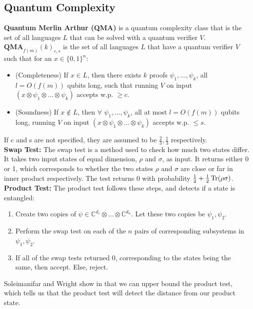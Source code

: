\documentclass[10pt]{article}
\newcommand{\C}{\mathbb{C}}
\begin{document}
\subsection{Quantum Complexity}
\textbf{Quantum Merlin Arthur (QMA)} is a quantum complexity class that is the set of all languages $L$ that can be solved with a quantum verifier $V$. $\textbf{QMA}_{f(m)}(k)_{c,s}$ is the set of all languages $L$ that have a quantum verifier $V$ such that for an $x \in \{0,1\}^n$:
\begin{itemize}
    \item 
    (Completeness) If $x \in L$, then there exists $k$ proofs $\psi_1, \dots, \psi_k$, all $l = O(f(m))$ qubits long, such that running $V$ on input $(x \otimes \psi_1 \otimes \dots \otimes \psi_k)$ accepts w.p. $\ge c$.
    \item
    (Soundness) If $x \notin L$, then $\forall$ $\psi_1, \dots, \psi_k$, all at most $l = O(f(m))$ qubits long,  running $V$ on input
    $(x \otimes \psi_1 \otimes \dots \otimes \psi_k)$ accepts w.p. $\le s$.
\end{itemize}
If c and s are not specified, they are assumed to be $\frac{2}{3}, \frac{1}{3}$ respectively.
\\


\noindent \textbf{Swap Test:} The swap test is a method used to check how much two states differ. It takes two input states of equal dimension, $\rho$ and $\sigma$, as input. It returns either 0 or 1, which corresponds to whether the two states $\rho$ and $\sigma$ are close or far in inner product respectively. The test returns 0 with probability $\frac{1}{2} + \frac{1}{2} \Tr(\rho\sigma)$. \\


\noindent \textbf{Product Test:} The product test follows these steps, and detects if a state is entangled:
\begin{enumerate}
    \item Create two copies of $\psi \in \C^{d_1} \otimes \dots \otimes \C^{d_n}.$ Let these two copies be $\psi_1,\psi_2$.
    \item Perform the swap test on each of the $n$ pairs of corresponding subsystems in $\psi_1, \psi_2$.
    \item If all of the swap tests returned 0, corresponding to the states being the same, then accept. Else, reject.
\end{enumerate}

Soleimanifar and Wright show in \cite{mps} that we can upper bound the product test, which tells us that the product test will detect the distance from our product state.
\end{document}
